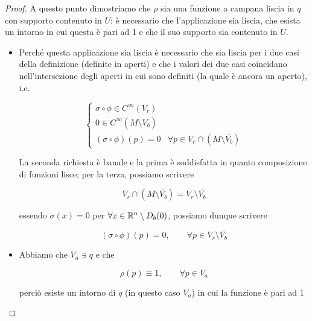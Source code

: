 \begin{proof}
	A questo punto dimostriamo che $ \rho $ sia una funzione a campana liscia in $ q $ con supporto contenuto in $ U $: è necessario che l'applicazione sia liscia, che esista un intorno in cui questa è pari ad 1 e che il suo supporto sia contenuto in $ U $.
	
	\begin{itemize}
		\item Perché questa applicazione sia liscia è necessario che sia liscia per i due casi della definizione (definite in aperti) e che i valori dei due casi coincidano nell'intersezione degli aperti in cui sono definiti (la quale è ancora un aperto), i.e.
		
		\begin{equation}
			\begin{cases}
				\sigma \circ \phi \in C^{\infty}(V_{r})\\
				0 \in C^{\infty} \left( M \setminus \overline{V_{b}} \right)\\
				(\sigma \circ \phi)(p) = 0 & \forall p \in V_{r} \cap (M \setminus \overline{V_{b}})
			\end{cases}
		\end{equation}
		
		La seconda richiesta è banale e la prima è soddisfatta in quanto composizione di funzioni lisce; per la terza, possiamo scrivere
		
		\begin{equation}
			V_{r} \cap \left( M \setminus \overline{V_{b}} \right) = V_{r} \setminus \overline{V_{b}}
		\end{equation}
		
		essendo $ \sigma(x) = 0 $ per $ \forall x \in \mathbb{R}^{n} \setminus D_{b}(0) $, possiamo dunque scrivere
		
		\begin{equation}
			(\sigma \circ \phi)(p) = 0, \qquad \forall p \in V_{r} \setminus \overline{V_{b}}
		\end{equation}
		
		
		\item Abbiamo che $ V_{a} \ni q $ e che
		
		\begin{equation}
			\rho(p) \equiv 1, \qquad \forall p \in V_{a}
		\end{equation}
	
		perciò esiste un intorno di $ q $ (in questo caso $ V_{a} $) in cui la funzione è pari ad 1
		
		

\end{itemize}
\end{proof}
